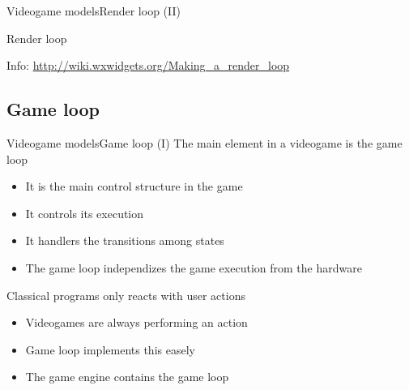 \documentclass[10pt,compress]{beamer} %
\begin{document}
\begin{frame}{Videogame models}{Render loop (II)}
	    \vspace{-0.2cm}
    \begin{block}{Render loop}
	    \vspace{-0.2cm}
	    
		\vspace{-0.2cm}
	\end{block}
	Info: \url{http://wiki.wxwidgets.org/Making\_a\_render\_loop}
\end{frame}


\subsection{Game loop}
\begin{frame}{Videogame models}{Game loop (I)}
	   	The main element in a videogame is the \alert{game loop}
		\begin{itemize}
			\item It is the main control structure in the game
			\item It controls its execution
			\item It handlers the transitions among states
			\item The game loop independizes the game execution from the hardware
		\end{itemize}
		Classical programs only reacts with user actions
		\begin{itemize}
			\item Videogames are always performing an action
			\item Game loop implements this easely
			\item The game engine contains the game loop
		\end{itemize}
\end{frame}
\end{document}
